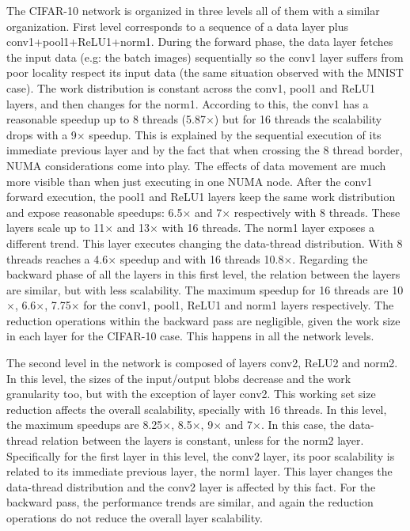 The CIFAR-10 network is organized in three levels all of them with a 
similar organization. First level corresponds to a sequence of a data 
layer plus conv1+pool1+ReLU1+norm1. During the forward phase, the data 
layer fetches the input data (e.g: the batch images) sequentially so 
the conv1 layer suffers from poor locality respect its input data 
(the same situation observed with the MNIST case). The work distribution 
is constant across the conv1, pool1 and ReLU1 layers, and then changes 
for the norm1. According to this, the conv1 has a 
reasonable speedup up to 8 threads (5.87$\times$) but for 16 threads the 
scalability drops with a 9$\times$ speedup. This is explained by the 
sequential execution of its immediate previous layer and by the fact 
that when crossing the 8 thread border, NUMA considerations come into 
play. The effects of data movement are much more visible than when 
just executing in one NUMA node. After the conv1 forward execution, 
the pool1 and ReLU1 layers keep the same work distribution and expose 
reasonable speedups: 6.5$\times$ and 7$\times$ respectively with 8 threads. These 
layers scale up to 11$\times$ and 13$\times$ with 16 threads. The norm1 layer exposes 
a different trend. This layer executes changing the data-thread 
distribution. With 8 threads reaches a 4.6$\times$ speedup and with 
16 threads 10.8$\times$. Regarding the backward phase of all the layers 
in this first level, the relation between the layers are similar, 
but with less scalability. The maximum speedup for 16 threads are 
10$\times$, 6.6$\times$, 7.75$\times$ for the conv1, pool1, ReLU1 and norm1 layers respectively. 
The reduction operations within the backward pass are negligible, 
given the work size in each layer for the CIFAR-10 case. This happens 
in all the network levels.

The second level in the network is composed of layers conv2, ReLU2 
and norm2. In this level, the sizes of the input/output blobs decrease 
and the work granularity too, but with the exception of layer conv2. 
This working set size reduction affects the overall scalability, 
specially with 16 threads. In this level, the maximum speedups are 
8.25$\times$, 8.5$\times$, 9$\times$ and 7$\times$. In this case, the data-thread relation between the 
layers is constant, unless for the norm2 layer. Specifically for the 
first layer in this level, the conv2 layer, its poor scalability is 
related to its immediate previous layer, the norm1 layer. This layer 
changes the data-thread distribution and the conv2 layer is affected 
by this fact. For the backward pass, the performance trends are similar, 
and again the reduction operations do not reduce the overall layer 
scalability.

